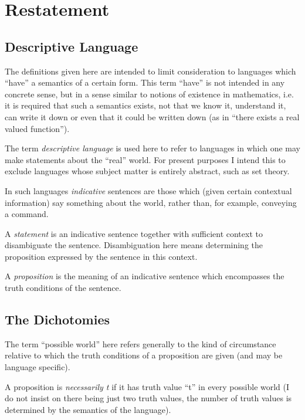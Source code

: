 \section{Restatement}\label{Restatement}

\subsection{Descriptive Language}

The definitions given here are intended to limit consideration to languages which ``have'' a semantics of a certain form.
This term ``have'' is not intended in any concrete sense, but in a sense similar to notions of existence in mathematics, i.e. it is required that such a semantics exists, not that we know it, understand it, can write it down or even that it could be written down (as in ``there exists a real valued function'').

The term {\it descriptive language} is used here to refer to languages in which one may make statements about the ``real'' world.
For present purposes I intend this to exclude languages whose subject matter is entirely abstract, such as set theory.

In such languages {\it indicative} sentences are those which (given certain contextual information) say something about the world, rather than, for example, conveying a command.

A {\it statement} is an indicative sentence together with sufficient context to disambiguate the sentence.
Disambiguation here means determining the proposition expressed by the sentence in this context.

A {\it proposition} is the meaning of an indicative sentence which encompasses the truth conditions of the sentence.

\subsection{The Dichotomies}

The term ``possible world'' here refers generally to the kind of circumstance relative to which the truth conditions of a proposition are given (and may be language specific).

A proposition is {\it necessarily t} if it has truth value ``t'' in every possible world (I do not insist on there being just two truth values, the number of truth values is determined by the semantics of the language).

